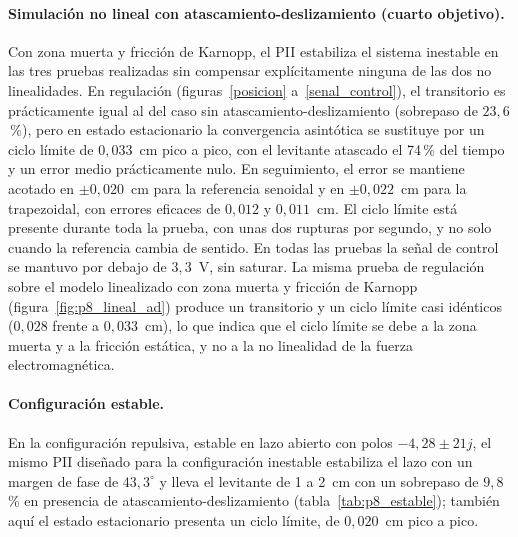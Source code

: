 \paragraph{Simulación no lineal con atascamiento-deslizamiento (cuarto objetivo).}
Con zona muerta y fricción de Karnopp, el PII estabiliza el sistema inestable en las tres pruebas realizadas sin compensar explícitamente ninguna de las dos no linealidades. En regulación (figuras~\ref{posicion} a~\ref{senal_control}), el transitorio es prácticamente igual al del caso sin atascamiento-deslizamiento (sobrepaso de $23{,}6$\,\%), pero en estado estacionario la convergencia asintótica se sustituye por un ciclo límite de $0{,}033$~cm pico a pico, con el levitante atascado el 74\,\% del tiempo y un error medio prácticamente nulo. En seguimiento, el error se mantiene acotado en $\pm0{,}020$~cm para la referencia senoidal y en $\pm0{,}022$~cm para la trapezoidal, con errores eficaces de $0{,}012$ y $0{,}011$~cm. El ciclo límite está presente durante toda la prueba, con unas dos rupturas por segundo, y no solo cuando la referencia cambia de sentido. En todas las pruebas la señal de control se mantuvo por debajo de $3{,}3$~V, sin saturar. La misma prueba de regulación sobre el modelo linealizado con zona muerta y fricción de Karnopp (figura~\ref{fig:p8_lineal_ad}) produce un transitorio y un ciclo límite casi idénticos ($0{,}028$ frente a $0{,}033$~cm), lo que indica que el ciclo límite se debe a la zona muerta y a la fricción estática, y no a la no linealidad de la fuerza electromagnética.

\paragraph{Configuración estable.}
En la configuración repulsiva, estable en lazo abierto con polos $-4{,}28\pm21j$, el mismo PII diseñado para la configuración inestable estabiliza el lazo con un margen de fase de $43{,}3^\circ$ y lleva el levitante de 1 a 2~cm con un sobrepaso de $9{,}8$\,\% en presencia de atascamiento-deslizamiento (tabla~\ref{tab:p8_estable}); también aquí el estado estacionario presenta un ciclo límite, de $0{,}020$~cm pico a pico.


